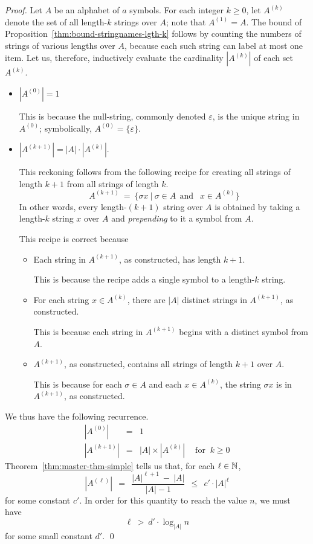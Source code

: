 \begin{proof}
Let $A$ be an alphabet of $a$ symbols.  For each integer $k \geq 0$,
let $A^{(k)}$ denote the set of all length-$k$ strings over $A$; note
that $A^{(1)} = A$.  The bound of
Proposition~\ref{thm:bound-stringnames-lgth-k} follows by counting the
numbers of strings of various lengths over $A$, because each such
string can label at most one item.  Let us, therefore, inductively
evaluate the cardinality $|A^{(k)}|$ of each set $A^{(k)}$.
\begin{itemize}
\item
$|A^{(0)}| =1$

This is because the null-string, commonly denoted $\varepsilon$, 
is the unique string in $A^{(0)}$; symbolically, $A^{(0)} = \{
\varepsilon \}$.

\item
$|A^{(k+1)}| = |A| \cdot |A^{(k)}|$.

This reckoning follows from the following recipe for creating all
strings of length $k+1$ from all strings of length $k$.
\[
A^{(k+1)} \ = \ \{ \sigma x \ | \ \sigma \in A \ \ \mbox{
  and } \ \ x \in A^{(k)} \}
\]
In other words, every length-$(k+1)$ string over $A$ is obtained
by taking a length-$k$ string $x$ over $A$ and {\em prepending}
 to it a symbol from $A$.

This recipe is correct because
  \begin{itemize}
  \item
Each string in $A^{(k+1)}$, as constructed, has length $k+1$.

This is because the recipe adds a single symbol to a length-$k$
string.
  \item
For each string $x \in A^{(k)}$, there are $|A|$ distinct
strings in $A^{(k+1)}$, as constructed.

This is because each string in $A^{(k+1)}$ begins with a distinct
symbol from $A$.

  \item
$A^{(k+1)}$, as constructed, contains all strings of length $k+1$
over $A$.

This is because for each $\sigma \in A$ and each $x \in
A^{(k)}$, the string $\sigma x$ is in $A^{(k+1)}$, as
constructed.
  \end{itemize}
\end{itemize}
We thus have the following recurrence.
\begin{eqnarray*}
|A^{(0)}| & = & 1 \\
|A^{(k+1)}| & = & |A| \times |A^{(k)}| \ \ \ \ 
\mbox{ for } \ k \geq 0
\end{eqnarray*}
Theorem~\ref{thm:master-thm-simple} tells us that, for each $\ell \in \mathbb{N}$,
\[ |A^{(\ell)}| \ \ = \ \ \frac{|A|^{\ell+1} \ - \ |A|}
{|A| -1} \ \ \leq \ \ c' \cdot |A|^{\ell}
\]
for some constant $c'$.  In order for this quantity to reach the value
$n$, we must have
\[ \ell \ > \ d' \cdot \log_{|A|} n   \]
for some small constant $d'$.  \qed
\end{proof}

